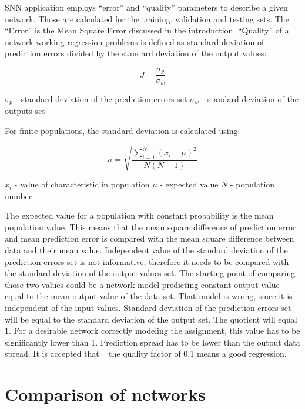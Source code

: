 \documentclass[10pt,oneside]{memoir}
\begin{document}
SNN application employs ``error'' and ``quality'' parameters to describe a given network. Those are calculated for the training, validation and testing sets.
The ``Error'' is the Mean Square Error discussed in the introduction. ``Quality'' of a network working regression problems is defined as standard deviation of prediction errors divided by the standard deviation of the output values:


\begin{equation}
J=\frac{{\sigma }_{p}}{{\sigma }_{w}}
\end{equation}


$ {\sigma }_{p}$ - standard deviation of the prediction errors set
$ {\sigma }_{w}$ - standard deviation of the outputs set


For finite populations, the standard deviation is calculated using:


\begin{equation}
\sigma =\sqrt{\frac{\sum _{i=1}^{N}{({x}_{i}-\mu )}^{2}}{N(N-1)}}
\end{equation}


$ {x}_{i}$ - value of characteristic in population
$ \mu $ - expected value
$ N$ - population number


The expected value for a population with constant probability is the mean population value. This means that the mean square difference of prediction error and mean prediction error is compared with the mean square difference between data and their mean value.
Independent value of the standard deviation of the prediction errors set is not informative; therefore it needs to be compared with the standard deviation of the output values set. The starting point of comparing those two values could be a network model predicting constant output value equal to the mean output value of the data set. That model is wrong, since it is independent of the input values. Standard deviation of the prediction errors set will be equal to the standard deviation of the output set. The quotient will equal 1.
For a desirable network correctly modeling the assignment, this value has to be significantly lower than 1. Prediction spread has to be lower than the output data spread. It is accepted that ~\cite{Statistica:2004} the quality factor of 0.1 means a good regression.


\section{Comparison of networks}
\label{comparisonofnetworks}
\end{document}

